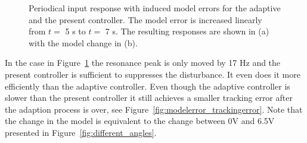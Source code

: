 \begin{figure}[h!]
  \centering %
  \qquad
  \caption{\label{fig:modelerror}Periodical input response with induced model errors for the adaptive and the present controller. The model error is increased linearly from $t=$ 5 s to $t=$ 7 s. The resulting responses are shown in (a) with the model change in (b).}
\end{figure}

In the case in Figure~\ref{fig:modelerror} the resonance peak is only moved by 17 Hz and the present controller is sufficient to suppresses the disturbance. It even does it more efficiently than the adaptive controller. Even though the adaptive controller is slower than the present controller it still achieves a smaller tracking error after the adaption process is over, see Figure~\ref{fig:modelerror_trackingerror}. Note that the change in the model is equivalent to the change between 0V and 6.5V presented in Figure~\ref{fig:different_angles}.

